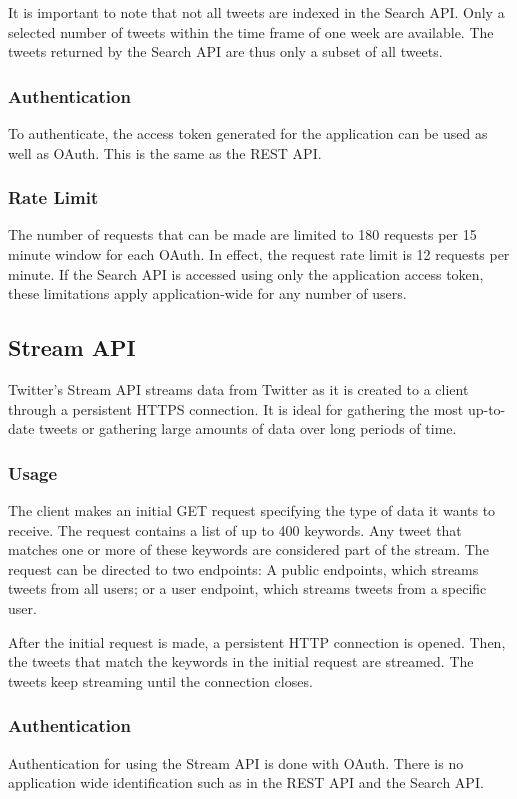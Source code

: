 It is important to note that not all tweets are indexed in the Search API. Only a selected number of tweets within the time frame of one week are available. The tweets returned by the Search API are thus only a subset of all tweets.\cite{twitter-search-api-timeframe}

\subsubsection{Authentication}
To authenticate, the access token generated for the application can be used as well as OAuth. This is the same as the REST API. \cite{twitter-rest-api}

\subsubsection{Rate Limit}
The number of requests that can be made are limited to 180 requests per 15 minute window for each OAuth. In effect, the request rate limit is 12 requests per minute. If the Search API is accessed using only the application access token, these limitations apply application-wide for any number of users.\cite{twitter-rate-limiting}

\subsection{Stream API}
Twitter's Stream API streams data from Twitter as it is created to a client through a persistent HTTPS connection. It is ideal for gathering the most up-to-date tweets or gathering large amounts of data over long periods of time.

\subsubsection{Usage}
The client makes an initial GET request specifying the type of data it wants to receive. The request contains a list of up to 400 keywords. Any tweet that matches one or more of these keywords are considered part of the stream. The request can be directed to two endpoints: A public endpoints, which streams tweets from all users; or a user endpoint, which streams tweets from a specific user.

After the initial request is made, a persistent HTTP connection is opened. Then, the tweets that match the keywords in the initial request are streamed. The tweets keep streaming until the connection closes.

\subsubsection{Authentication}
Authentication for using the Stream API is done with OAuth. There is no application wide identification such as in the REST API and the Search API.

